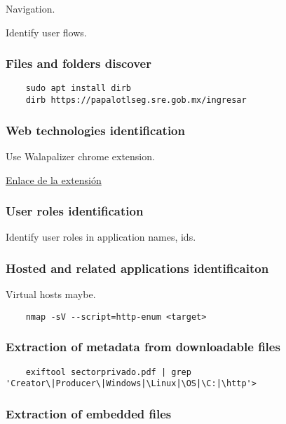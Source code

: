 \documentclass[letterpaper,12pt]{extarticle}
\begin{document}
Navigation.

Identify user flows.

\subsubsection{Files and folders discover}

\begin{verbatim}
	sudo apt install dirb
	dirb https://papalotlseg.sre.gob.mx/ingresar
\end{verbatim}

\subsubsection{Web technologies identification}

Use Walapalizer chrome extension.

\href{https://chrome.google.com/webstore/detail/wappalyzer-technology-pro/gppongmhjkpfnbhagpmjfkannfbllamg}{Enlace de la extensión}

\subsubsection{User roles identification}

Identify user roles in application names, ids.

\subsubsection{Hosted and related applications identificaiton}

Virtual hosts maybe.

\begin{verbatim}
	nmap -sV --script=http-enum <target>
\end{verbatim}


\subsubsection{Extraction of metadata from downloadable files}

\begin{verbatim}
	exiftool sectorprivado.pdf | grep 'Creator\|Producer\|Windows|\Linux|\OS|\C:|\http'>
\end{verbatim}

\subsubsection{Extraction of embedded files}
\end{document}
